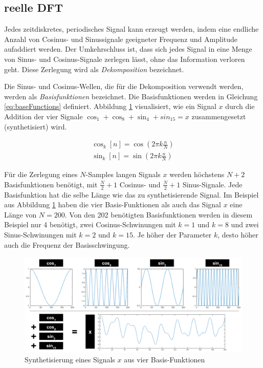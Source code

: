 \subsection{reelle DFT}

Jedes zeitdiskretes, periodisches Signal kann erzeugt werden, indem eine endliche Anzahl von Cosinus- und Sinussignale geeigneter Frequenz und Amplitude aufaddiert werden. Der Umkehrschluss ist, dass sich jedes Signal in eine Menge von Sinus- und Cosinus-Signale zerlegen lässt, ohne das Information verloren geht. Diese Zerlegung wird als \emph{Dekomposition} bezeichnet. 

Die Sinus- und Cosinus-Wellen, die für die Dekomposition verwendt werden, werden als \emph{Basisfunktionen} bezeichnet. Die Basisfunktionen werden in Gleichung \ref{eq:baseFunctions} definiert. Abbildung \ref{img:fftExample01} visualisiert, wie ein Signal $x$ durch die Addition der vier Signale $\cos_1 + \cos_8 + \sin_4 + sin_15 = x$ zusammengesetzt (synthetisiert) wird.

\begin{equation}
\label{eq:baseFunctions}
\begin{split}
\cos_k[n] = \cos(2\pi k \frac{n}{N}) \\
\sin_k[n] = \sin(2\pi k \frac{n}{N})
\end{split}
\end{equation}

Für die Zerlegung eines $N$-Samples langen Signals $x$ werden höchstens $N+2$ Basisfunktionen benötigt, mit $\frac{N}{2}+1$ Cosinus- und  $\frac{N}{2}+1$ Sinus-Signale. Jede Basisfunktion hat die selbe Länge wie das zu synthetisierende Signal. Im Beispiel aus Abbildung \ref{img:fftExample01} haben die vier Basis-Funktionen als auch das Signal $x$ eine Länge von $N = 200$. Von den 202 benötigten Basisfunktionen werden in diesem Beispiel nur 4 benötigt, zwei Cosinus-Schwinungen mit $k = 1$ und $k = 8$ und zwei Sinus-Schwinungen mit $k = 2$ und $k=15$. Je höher der Parameter $k$, desto höher auch die Frequenz der Basisschwingung. 

\begin{figure}[h]
	\centering
	\includegraphics[width=1\textwidth]{bilder/fftExp01.png}
	\caption{Synthetisierung eines Signals $x$ aus vier Basis-Funktionen}
	\label{img:fftExample01}
\end{figure}

